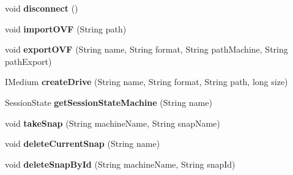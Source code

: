 \begin{DoxyCompactItemize}
\item 
\mbox{\label{classrwb_1_1java_1_1vb_1_1bo_1_1_virtual_box_b_o_a6b80c60e1cd785c90112dba14634c32f}} 
void {\bfseries disconnect} ()
\item 
\mbox{\label{classrwb_1_1java_1_1vb_1_1bo_1_1_virtual_box_b_o_afcc3e39aceb8f6b54a6e685be99b06bb}} 
void {\bfseries import\+O\+VF} (String path)
\item 
\mbox{\label{classrwb_1_1java_1_1vb_1_1bo_1_1_virtual_box_b_o_a3de84f90e7bf269ea77425b51ac32508}} 
void {\bfseries export\+O\+VF} (String name, String format, String path\+Machine, String path\+Export)
\item 
\mbox{\label{classrwb_1_1java_1_1vb_1_1bo_1_1_virtual_box_b_o_aadefbe8f63bec082c655a3cd982cf74f}} 
I\+Medium {\bfseries create\+Drive} (String name, String format, String path, long size)
\item 
\mbox{\label{classrwb_1_1java_1_1vb_1_1bo_1_1_virtual_box_b_o_a434bf6a67ae65900771c2186f19dc40e}} 
Session\+State {\bfseries get\+Session\+State\+Machine} (String name)
\item 
\mbox{\label{classrwb_1_1java_1_1vb_1_1bo_1_1_virtual_box_b_o_a93771b8cfcdc1f2e7bf4d09552c58f30}} 
void {\bfseries take\+Snap} (String machine\+Name, String snap\+Name)
\item 
\mbox{\label{classrwb_1_1java_1_1vb_1_1bo_1_1_virtual_box_b_o_a2ab0e1fd48e3d8b4f92a8fdb3050fa0e}} 
void {\bfseries delete\+Current\+Snap} (String name)
\item 
\mbox{\label{classrwb_1_1java_1_1vb_1_1bo_1_1_virtual_box_b_o_a104e202e86e7776840c3a21a91010d9a}} 
void {\bfseries delete\+Snap\+By\+Id} (String machine\+Name, String snap\+Id)
\item 
\mbox{\label{classrwb_1_1java_1_1vb_1_1bo_1_1_virtual_box_b_o_a7b659b7c9c7139fd6042c34b98507b12}} 

\end{DoxyCompactItemize}
